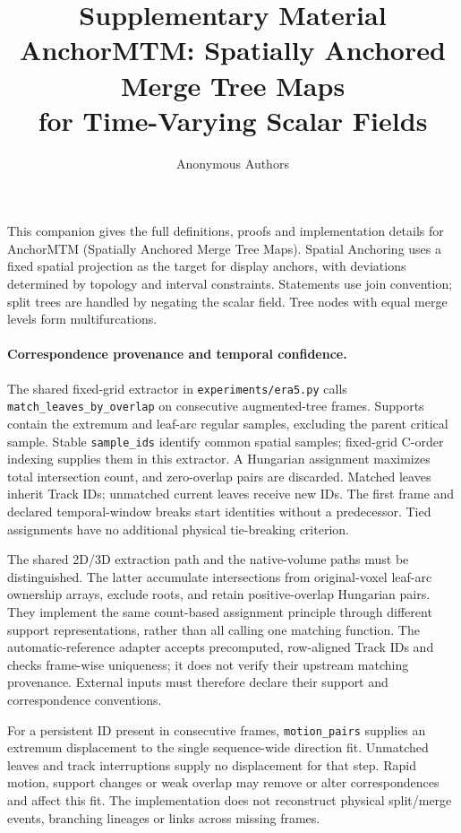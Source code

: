 \documentclass[10pt]{article}
\title{Supplementary Material\\\large AnchorMTM: Spatially Anchored Merge Tree Maps\\for Time-Varying Scalar Fields}
\author{Anonymous Authors}\date{}
\begin{document}
\maketitle
This companion gives the full definitions, proofs and implementation details for AnchorMTM (Spatially Anchored Merge Tree Maps). Spatial Anchoring uses a fixed spatial projection as the target for display anchors, with deviations determined by topology and interval constraints. Statements use join convention; split trees are handled by negating the scalar field. Tree nodes with equal merge levels form multifurcations.
\paragraph{Correspondence provenance and temporal confidence.}
The shared fixed-grid extractor in \texttt{experiments/era5.py} calls \texttt{match\_leaves\_by\_overlap} on consecutive augmented-tree frames. Supports contain the extremum and leaf-arc regular samples, excluding the parent critical sample. Stable \texttt{sample\_ids} identify common spatial samples; fixed-grid C-order indexing supplies them in this extractor. A Hungarian assignment maximizes total intersection count, and zero-overlap pairs are discarded. Matched leaves inherit Track IDs; unmatched current leaves receive new IDs. The first frame and declared temporal-window breaks start identities without a predecessor. Tied assignments have no additional physical tie-breaking criterion.

The shared 2D/3D extraction path and the native-volume paths must be distinguished. The latter accumulate intersections from original-voxel leaf-arc ownership arrays, exclude roots, and retain positive-overlap Hungarian pairs. They implement the same count-based assignment principle through different support representations, rather than all calling one matching function. The automatic-reference adapter accepts precomputed, row-aligned Track IDs and checks frame-wise uniqueness; it does not verify their upstream matching provenance. External inputs must therefore declare their support and correspondence conventions.

For a persistent ID present in consecutive frames, \texttt{motion\_pairs} supplies an extremum displacement to the single sequence-wide direction fit. Unmatched leaves and track interruptions supply no displacement for that step. Rapid motion, support changes or weak overlap may remove or alter correspondences and affect this fit. The implementation does not reconstruct physical split/merge events, branching lineages or links across missing frames.
\end{document}
